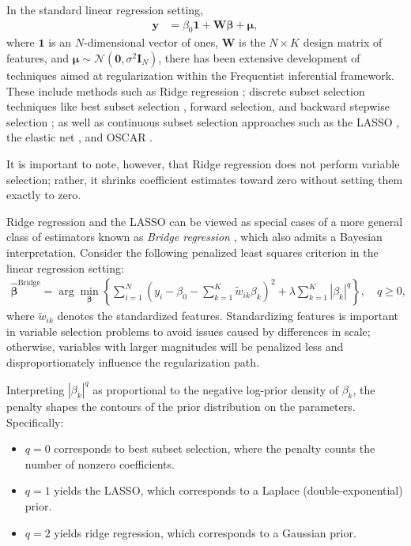 In the standard linear regression setting,
\begin{align*}
	\mathbf{y} &= \beta_0\mathbf{1} + \mathbf{W}\boldsymbol{\beta} + \boldsymbol{\mu},
\end{align*}
where \(\mathbf{1}\) is an \(N\)-dimensional vector of ones, \(\mathbf{W}\) is the \(N \times K\) design matrix of features, and \(\boldsymbol{\mu} \sim \mathcal{N}(\mathbf{0}, \sigma^2 \mathbf{I}_N)\), there has been extensive development of techniques aimed at regularization within the Frequentist inferential framework. These include methods such as Ridge regression \cite{hoerl1970ridge}; discrete subset selection techniques like best subset selection \cite{furnival1974regressions}, forward selection, and backward stepwise selection \cite{hastie2009elements}; as well as continuous subset selection approaches such as the LASSO \cite{tibshirani1996regression}, the elastic net \cite{zou2005regularization}, and OSCAR \cite{bondell2008simultaneous}.

It is important to note, however, that Ridge regression does not perform variable selection; rather, it shrinks coefficient estimates toward zero without setting them exactly to zero.

Ridge regression and the LASSO can be viewed as special cases of a more general class of estimators known as \textit{Bridge regression} \cite{fu1998penalized}, which also admits a Bayesian interpretation. Consider the following penalized least squares criterion in the linear regression setting:
\begin{align*}
	\hat{\boldsymbol{\beta}}^{\text{Bridge}} = \arg\min_{\boldsymbol{\beta}} \left\{ \sum_{i=1}^N \left( y_i - \beta_0 - \sum_{k=1}^K \tilde{w}_{ik} \beta_k \right)^2 + \lambda \sum_{k=1}^K |\beta_k|^q \right\}, \quad q \geq 0,
\end{align*}
where \(\tilde{w}_{ik}\) denotes the standardized features. Standardizing features is important in variable selection problems to avoid issues caused by differences in scale; otherwise, variables with larger magnitudes will be penalized less and disproportionately influence the regularization path.

Interpreting \( |\beta_k|^q \) as proportional to the negative log-prior density of \( \beta_k \), the penalty shapes the contours of the prior distribution on the parameters. Specifically:
\begin{itemize}
	\item \( q = 0 \) corresponds to best subset selection, where the penalty counts the number of nonzero coefficients.
	\item \( q = 1 \) yields the LASSO, which corresponds to a Laplace (double-exponential) prior.
	\item \( q = 2 \) yields ridge regression, which corresponds to a Gaussian prior.  
	 
\end{itemize}

